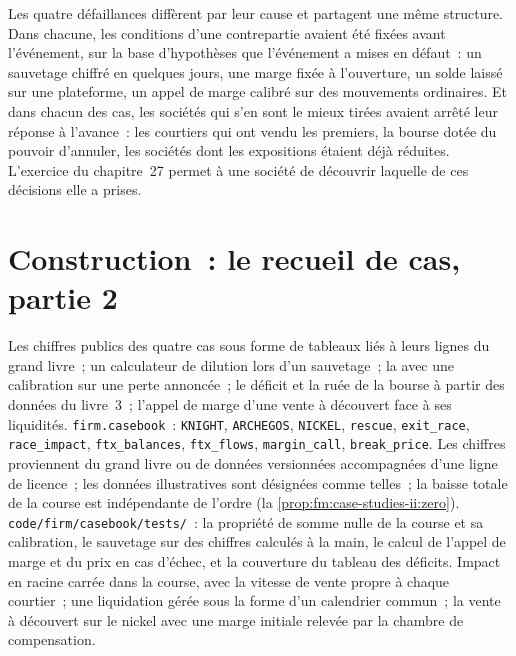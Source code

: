 Les quatre défaillances diffèrent par leur cause et partagent une même structure. Dans chacune, les conditions d'une contrepartie avaient été fixées avant l'événement, sur la base d'hypothèses que l'événement a mises en défaut~: un
sauvetage chiffré en quelques jours, une marge fixée à l'ouverture, un solde laissé sur une plateforme, un appel de marge calibré sur des mouvements ordinaires. Et dans chacun des cas, les sociétés qui s'en sont le mieux tirées
avaient arrêté leur réponse à l'avance~: les courtiers qui ont vendu les premiers, la bourse dotée du pouvoir d'annuler, les sociétés dont les expositions étaient déjà
réduites. L'exercice du chapitre~27 permet à une société de découvrir laquelle de ces décisions elle a prises.

\section{Construction~: le recueil de cas, partie 2}\label{bld:fm:case-studies-ii:casebook}

\begin{build}
 Les chiffres publics des quatre cas sous forme de tableaux liés à leurs lignes du grand livre~; un calculateur de dilution lors d'un sauvetage~; la  avec une calibration
sur une perte annoncée~; le déficit et la ruée de la bourse à partir des données du livre~3~; l'appel de marge d'une vente à découvert face à ses liquidités.
 \texttt{firm.casebook}~: \texttt{KNIGHT}, \texttt{ARCHEGOS}, \texttt{NICKEL}, \texttt{rescue}, \texttt{exit\_race},
\texttt{race\_impact}, \texttt{ftx\_balances}, \texttt{ftx\_flows}, \texttt{margin\_call}, \texttt{break\_price}.
 Les chiffres proviennent du grand livre ou de données versionnées accompagnées d'une ligne de licence~; les données illustratives sont désignées comme telles~; la baisse totale de la course est
indépendante de l'ordre (la \cref{prop:fm:case-studies-ii:zero}).
 \texttt{code/firm/casebook/tests/}~: la propriété de somme nulle de la course et sa calibration, le sauvetage sur des chiffres calculés à la main, le
calcul de l'appel de marge et du prix en cas d'échec, et la couverture du tableau des déficits.
 Impact en racine carrée dans la course, avec la vitesse de vente propre à chaque courtier~; une liquidation gérée sous la forme d'un calendrier commun~; la vente à découvert sur le nickel
avec une marge initiale relevée par la chambre de compensation.
\end{build}

